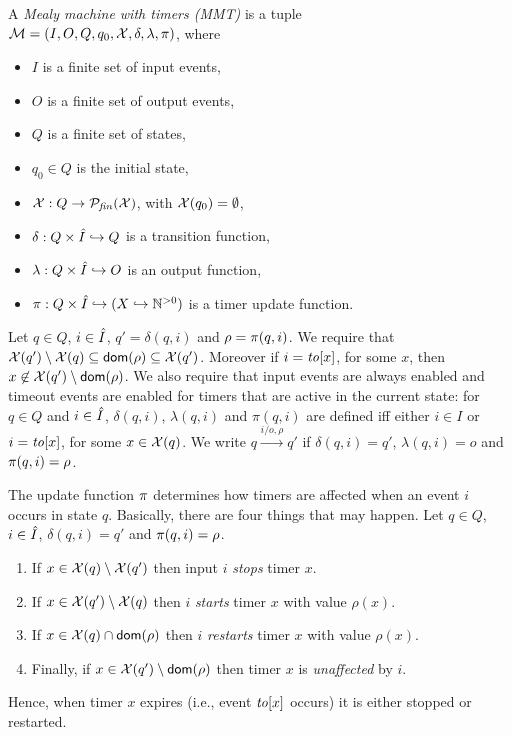 \begin{definition}
\label{def:MMT}
A \emph{Mealy machine with timers (MMT)} is a tuple
\\
${\cal M} = (I, O, Q, q_0, \mathcal{X}, \delta, \lambda, \pi)$, where
\begin{itemize}
\item
$I$ is a finite set of input events,
\item
$O$ is a finite set of output events, 
\item
$Q$ is a finite set of states,
\item
$q_0 \in Q$ is the initial state,
\item
$\mathcal{X}: Q \rightarrow \cal{P}_{\mathit{fin}}(X)$, with $\mathcal{X}(q_0) = \emptyset$,
\item
$\delta: Q \times \hat{I} \hookrightarrow  Q$ is a transition function,
\item
$\lambda: Q \times \hat{I} \hookrightarrow O$ is an output function, 
\item
$\pi : Q \times \hat{I} \hookrightarrow (X \hookrightarrow {\mathbb N}^{>0})$ is a timer update function.
\end{itemize}
Let $q \in Q$, $i \in \hat{I}$, $q'=\delta(q,i)$ and $\rho=\pi(q,i)$. 
We require that $\mathcal{X}(q') \setminus \mathcal{X}(q) \subseteq {\textsf{dom}}(\rho) \subseteq\mathcal{X}(q')$. Moreover
  if $i=\mathit{to}[x]$, for some $x$, then $x \not\in \mathcal{X}(q') \setminus {\textsf{dom}}(\rho)$.
%
We also require that input events are always enabled and timeout events are enabled
for timers that are active in the current state:
for $q \in Q$ and $i \in \hat{I}$,  $\delta(q,i)$, $\lambda(q,i)$ and $\pi(q,i)$ are defined iff either
$i \in I$ or $i=\mathit{to}[x]$, for some $x \in\mathcal{X}(q)$.
We write $q \xrightarrow{i/o,\rho} q'$ if $\delta(q,i) = q'$, $\lambda(q,i)= o$ and $\pi(q,i) = \rho$.
\end{definition}
The update function $\pi$ determines how timers are affected when an event $i$ occurs in state $q$.
Basically, there are four things that may happen.
Let $q \in Q$, $i \in \hat{I}$, $\delta(q,i)=q'$ and $\pi(q,i)=\rho$.
\begin{enumerate}
\item
If $x \in\mathcal{X}(q) \setminus \mathcal{X}(q')$ then input $i$ \emph{stops} timer $x$.
\item
If $x \in \mathcal{X}(q') \setminus \mathcal{X}(q)$ then $i$ \emph{starts} timer $x$ with value $\rho(x)$.
\item
If $x \in \mathcal{X}(q) \cap {\textsf{dom}}(\rho)$ then $i$ \emph{restarts} timer $x$ with value $\rho(x)$.
\item
Finally, if $x \in \mathcal{X}(q') \setminus {\textsf{dom}}(\rho)$ then timer $x$ is \emph{unaffected} by $i$.
\end{enumerate}
Hence, when timer $x$ expires (i.e., event $\mathit{to}[x]$ occurs) it is either stopped or restarted.

